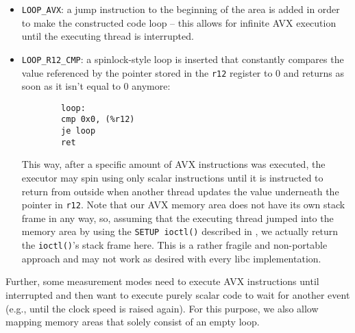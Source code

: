 \begin{itemize}
	\item \texttt{LOOP\_AVX}: a jump instruction to the beginning of the area is added in order to make the constructed code loop -- this allows for infinite \gls{AVX} execution until the executing thread is interrupted.
	\item \texttt{LOOP\_R12\_CMP}: a spinlock-style loop is inserted that constantly compares the value referenced by the pointer stored in the \texttt{r12} register to $0$ and returns as soon as it isn't equal to $0$ anymore:
		\begin{verbatim}
		loop:
		cmp 0x0, (%r12)
		je loop
		ret
		\end{verbatim}
		This way, after a specific amount of \gls{AVX} instructions was executed, the executor may spin using only scalar instructions until it is instructed to return from outside when another thread updates the value underneath the pointer in \texttt{r12}. Note that our \gls{AVX} memory area does not have its own stack frame in any way, so, assuming that the executing thread jumped into the memory area by using the \texttt{SETUP ioctl()} described in , we actually return the \texttt{ioctl()}'s stack frame here. This is a rather fragile and non-portable approach and may not work as desired with every \gls{libc} implementation.
\end{itemize}

Further, some measurement modes need to execute \gls{AVX} instructions until interrupted and then want to execute purely scalar code to wait for another event (e.g., until the clock speed is raised again). For this purpose, we also allow mapping memory areas that solely consist of an empty loop.

